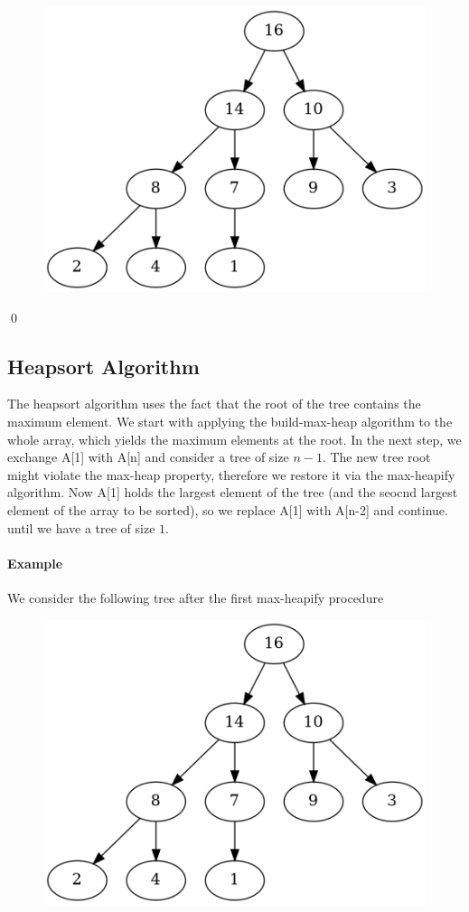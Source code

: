 \begin{figure}[H]
\centering
\includegraphics[scale=0.5]{images/heapsort_15.png}
\end{figure}

\qed

\subsection{Heapsort Algorithm}

The heapsort algorithm uses the fact that the root of the tree contains the maximum element. We start with applying the build-max-heap algorithm to the whole array, which yields the maximum elements at the root. In the next step, we exchange A[1] with A[n] and consider a tree of size $n-1$. The new tree root might violate the max-heap property, therefore we restore it via the max-heapify algorithm. Now A[1] holds the largest element of the tree (and the seocnd largest element of the array to be sorted), so we replace A[1] with A[n-2] and continue. until we have a tree of size $1$.

\paragraph{Example}

We consider the following tree after the first max-heapify procedure

\begin{figure}[H]
\centering
\includegraphics[scale=0.5]{images/heapsort_20.png}
\end{figure}


